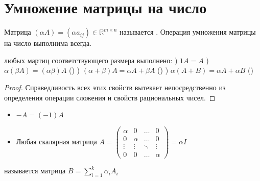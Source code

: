 \section{Умножение матрицы на число}
\begin{opred}
Матрица $(\alpha{}A)=\left( \alpha{}a_{ij} \right) \in \mathbb {R}^{m\times{}n}$ называется . Операция умножения матрицы на число выполнима всегда.
\end{opred}
\begin{theor}
 любых мартиц соответствующего размера выполнено:
) $1A=A$
) $\alpha(\beta{}A)=(\alpha{}\beta)A$ ()
) $(\alpha+\beta)A=\alpha{}A+\beta{}A$ ()
) $\alpha(A+B)=\alpha{}A+\alpha{}B$ ()
\end{theor}
\begin{proof}
Справедливость всех этих свойств вытекает непосредственно из определения операции сложения и свойств рациональных чисел.
\end{proof}
\begin{itemize}
\item $-A=(-1)A$
\item Любая скалярная матрица
$
A=\begin{pmatrix}
\alpha & 0       & \ldots & 0      \\
0       & \alpha & \ldots & 0      \\
\vdots  & \vdots  & \ddots & \vdots \\
0       & 0       & \ldots & \alpha
\end{pmatrix}=\alpha{}I
$
\end{itemize}
\begin{opred}
 называется матрица $B=\sum\limits_{i=1}^k\alpha_iA_i$
\end{opred}
